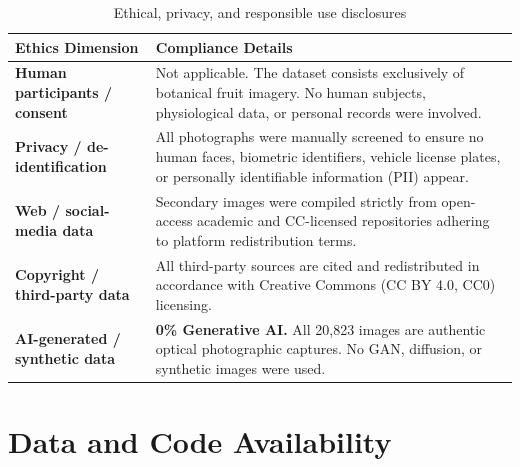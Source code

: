\documentclass[11pt,a4paper]{article}
\begin{document}
\begin{table}[H]
\centering\small
\begin{tabular}{|p{}|p{}|}
\hline
\textbf{Ethics Dimension} & \textbf{Compliance Details} \\
\hline
\textbf{Human participants / consent} & Not applicable. The dataset consists exclusively of botanical fruit imagery. No human subjects, physiological data, or personal records were involved. \\ \hline
\textbf{Privacy / de-identification} & All photographs were manually screened to ensure no human faces, biometric identifiers, vehicle license plates, or personally identifiable information (PII) appear. \\ \hline
\textbf{Web / social-media data} & Secondary images were compiled strictly from open-access academic and CC-licensed repositories adhering to platform redistribution terms. \\ \hline
\textbf{Copyright / third-party data} & All third-party sources are cited and redistributed in accordance with Creative Commons (CC BY 4.0, CC0) licensing. \\ \hline
\textbf{AI-generated / synthetic data} & \textbf{0\% Generative AI.} All 20,823 images are authentic optical photographic captures. No GAN, diffusion, or synthetic images were used. \\ \hline
\end{tabular}
\caption{Ethical, privacy, and responsible use disclosures}
\label{tab:ethics-disclosure}
\end{table}

\section{Data and Code Availability}
\end{document}
